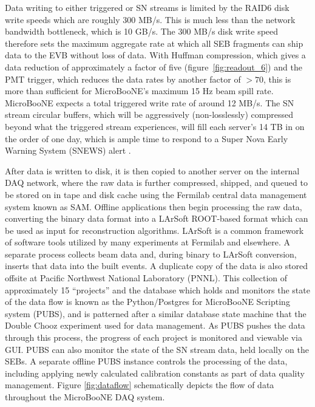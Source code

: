 Data writing to either triggered or SN streams is limited by the RAID6 disk write speeds which are roughly 300 MB/s. This is much less than the network bandwidth bottleneck, which is 10 GB/s. The 300 MB/s disk write speed therefore sets the maximum aggregate rate at which all SEB fragments can ship data to the EVB without loss of data. With Huffman compression, which gives a data reduction of approximately a factor of five (figure~\ref{fig:readout_6}) and the PMT trigger, which reduces the data rates by another factor of $>70$, this is more than sufficient for MicroBooNE's maximum 15 Hz beam spill rate. MicroBooNE expects a total triggered write rate of around 12 MB/s. The SN stream circular buffers, which will be aggressively (non-losslessly) compressed beyond what the triggered stream experiences, will fill each server's 14 TB in on the order of one day, which is ample time to respond to a Super Nova Early Warning System (SNEWS) alert \cite{Scholberg:2008fa}.

After data is written to disk, it is then copied to another server on the internal DAQ network, where the raw data is further compressed, shipped, and queued to be stored on in tape and disk cache using the Fermilab central data management system known as SAM.  Offline applications then begin processing the raw data, converting the binary data format into a LArSoft \cite{larsoft} ROOT-based format which can be used as input for reconstruction algorithms.  LArSoft is a common framework of software tools utilized by many \lartpc experiments at Fermilab and elsewhere.  A separate process collects beam data and, during binary to LArSoft conversion, inserts that data into the built events. A duplicate copy of the data is also stored offsite at Pacific Northwest National Laboratory (PNNL). This collection of approximately 15 ``projects''  and the database which holds and monitors the state of the data flow is known as the Python/Postgres for MicroBooNE Scripting system (PUBS), and is patterned after a similar database state machine that the Double Chooz experiment used for data management.  As PUBS pushes the data through this process, the progress of each project is monitored and viewable via GUI. PUBS can also monitor the state of the SN stream data, held locally on the SEBs.  A separate offline PUBS instance controls the processing of the data, including applying newly calculated calibration constants as part of data quality management.  Figure \ref{fig:dataflow} schematically depicts the flow of data throughout the MicroBooNE DAQ system.

